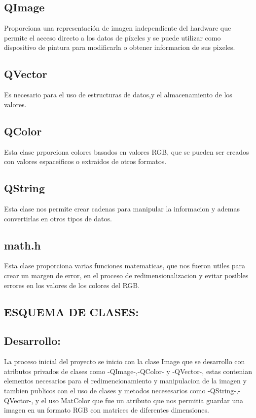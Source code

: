 \documentclass{article}
\begin{document}
\subsection{QImage}
 Proporciona una representación de imagen independiente del hardware que permite el acceso directo a los datos de píxeles y se puede utilizar como dispositivo de pintura para modificarla o obtener informacion de sus pixeles.

\subsection{QVector}
Es necesario para  el uso de estructuras de datos,y el almacenamiento de los valores.


\subsection{QColor}
Esta clase prporciona colores basados en valores RGB, que se pueden ser creados con valores espaceificos o extraidos de otros formatos.

\subsection{QString}
Esta clase nos permite crear cadenas para manipular la informacion y ademas convertirlas en otros tipos de datos.

\subsection{math.h}
Esta clase proporciona varias funciones matematicas, que nos fueron utiles para crear un margen de error, en el proceso de redimensionalizacion y evitar posibles errores en los valores de los colores del RGB.


\vspace{10cm}

\begin{center}
\Huge
\section{ESQUEMA DE CLASES: }
\end{center}
\subsection{Desarrollo:}
La proceso inicial del proyecto se inicio con la clase Image que se desarrollo con atributos  privados de clases como -QImage-,-QColor- y -QVector-, estas contenian elementos necesarios para el redimencionamiento y manipulacion de la imagen  y  tambien publicos con el uso de clases y metodos necesesarios como -QString-,-QVector-, y el uso MatColor que fue un atributo que nos permitia guardar una imagen en un formato RGB con   matrices de diferentes dimensiones.
\end{document}
